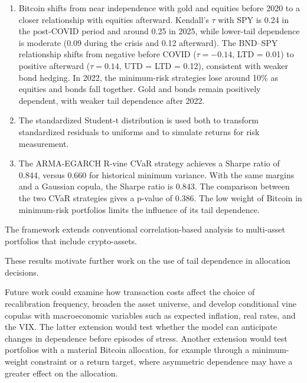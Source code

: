 \begin{enumerate}
  \item Bitcoin shifts from near independence with gold and equities before 2020 to a closer relationship with equities afterward. Kendall's $\tau$ with SPY is 0.24 in the post-COVID period and around 0.25 in 2025, while lower-tail dependence is moderate (0.09 during the crisis and 0.12 afterward). The BND--SPY relationship shifts from negative before COVID ($\tau=-0.14$, LTD = 0.01) to positive afterward ($\tau=0.14$, UTD = LTD = 0.12), consistent with weaker bond hedging. In 2022, the minimum-risk strategies lose around 10\% as equities and bonds fall together. Gold and bonds remain positively dependent, with weaker tail dependence after 2022.
  \item The standardized Student-t distribution is used both to transform standardized residuals to uniforms and to simulate returns for risk measurement.
  \item The ARMA-EGARCH R-vine CVaR strategy achieves a Sharpe ratio of 0.844, versus 0.660 for historical minimum variance. With the same margins and a Gaussian copula, the Sharpe ratio is 0.843. The comparison between the two CVaR strategies gives a p-value of 0.386. The low weight of Bitcoin in minimum-risk portfolios limits the influence of its tail dependence.
\end{enumerate}

The framework extends conventional correlation-based analysis to multi-asset portfolios that include crypto-assets.

These results motivate further work on the use of tail dependence in allocation decisions.

Future work could examine how transaction costs affect the choice of recalibration frequency, broaden the asset universe, and develop conditional vine copulas with macroeconomic variables such as expected inflation, real rates, and the VIX. The latter extension would test whether the model can anticipate changes in dependence before episodes of stress.
Another extension would test portfolios with a material Bitcoin allocation, for example through a minimum-weight constraint or a return target, where asymmetric dependence may have a greater effect on the allocation.

